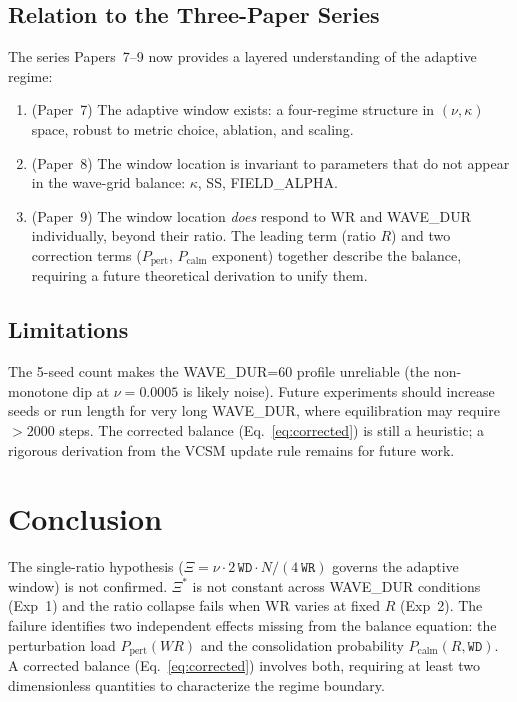 \documentclass[11pt]{article}
\theoremstyle{remark}
\begin{document}
\subsection{Relation to the Three-Paper Series}

The series Papers~7--9 now provides a layered understanding of the adaptive regime:

\begin{enumerate}
  \item (Paper~7) The adaptive window exists: a four-regime structure in
    $(\nu, \kappa)$ space, robust to metric choice, ablation, and scaling.
  \item (Paper~8) The window location is invariant to parameters that do not
    appear in the wave-grid balance: $\kappa$, SS, FIELD\_ALPHA.
  \item (Paper~9) The window location \emph{does} respond to WR and WAVE\_DUR
    individually, beyond their ratio. The leading term (ratio $R$) and two
    correction terms ($P_{\text{pert}}$, $P_{\text{calm}}$ exponent) together
    describe the balance, requiring a future theoretical derivation to unify them.
\end{enumerate}

\subsection{Limitations}

The 5-seed count makes the WAVE\_DUR=60 profile unreliable (the non-monotone
dip at $\nu = 0.0005$ is likely noise). Future experiments should increase seeds
or run length for very long WAVE\_DUR, where equilibration may require $>2000$ steps.
The corrected balance (Eq.~\eqref{eq:corrected}) is still a heuristic; a
rigorous derivation from the VCSM update rule remains for future work.

\section{Conclusion}

The single-ratio hypothesis ($\Xi = \nu \cdot 2\,\mathtt{WD} \cdot N/(4\,\mathtt{WR})$
governs the adaptive window) is not confirmed. $\Xi^*$ is not constant across
WAVE\_DUR conditions (Exp~1) and the ratio collapse fails when WR varies at fixed
$R$ (Exp~2). The failure identifies two independent effects missing from the
balance equation: the perturbation load $P_{\text{pert}}(WR)$ and the consolidation
probability $P_{\text{calm}}(R, \mathtt{WD})$. A corrected balance
(Eq.~\eqref{eq:corrected}) involves both, requiring at least two dimensionless
quantities to characterize the regime boundary.
\end{document}
